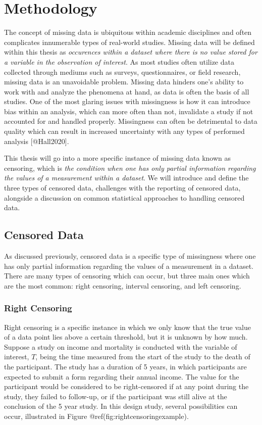 \documentclass[
]{article}
\author{}
\date{\vspace{-2.5em}}
\begin{document}
\hypertarget{methodology}{%
\section{Methodology}\label{methodology}}

The concept of missing data is ubiquitous within academic disciplines
and often complicates innumerable types of real-world studies. Missing
data will be defined within this thesis as \emph{occurences within a
dataset where there is no value stored for a variable in the observation
of interest}. As most studies often utilize data collected through
mediums such as surveys, questionnaires, or field research, missing data
is an unavoidable problem. Missing data hinders one's ability to work
with and analyze the phenomena at hand, as data is often the basis of
all studies. One of the most glaring issues with missingness is how it
can introduce bias within an analysis, which can more often than not,
invalidate a study if not accounted for and handled properly.
Missingness can often be detrimental to data quality which can result in
increased uncertainty with any types of performed analysis
{[}@Hall2020{]}.

This thesis will go into a more specific instance of missing data known
as censoring, which is \emph{the condition when one has only partial
information regarding the values of a measurement within a dataset}. We
will introduce and define the three types of censored data, challenges
with the reporting of censored data, alongside a discussion on common
statistical approaches to handling censored data.

\hypertarget{censored_data}{%
\subsection{Censored Data}\label{censored_data}}

As discussed previously, censored data is a specific type of missingness
where one has only partial information regarding the values of a
measurement in a dataset. There are many types of censoring which can
occur, but three main ones which are the most common: right censoring,
interval censoring, and left censoring.

\hypertarget{right}{%
\subsubsection{Right Censoring}\label{right}}

Right censoring is a specific instance in which we only know that the
true value of a data point lies above a certain threshold, but it is
unknown by how much. Suppose a study on income and mortality is
conducted with the variable of interest, \(T\), being the time measured
from the start of the study to the death of the participant. The study
has a duration of 5 years, in which participants are expected to submit
a form regarding their annual income. The value for the participant
would be considered to be right-censored if at any point during the
study, they failed to follow-up, or if the participant was still alive
at the conclusion of the 5 year study. In this design study, several
possibilities can occur, illustrated in Figure
@ref(fig:rightcensoringexample).
\end{document}

